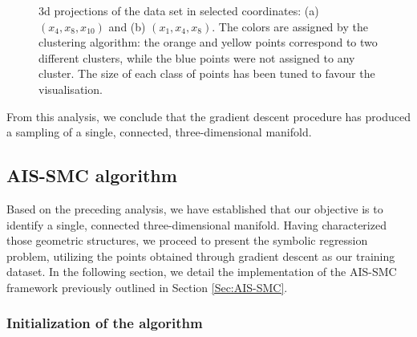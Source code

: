 \documentclass[11pt,a4paper]{article}
\begin{document}
\begin{figure}
{
		}
		\subfigure{\label{fig:3dx1x4x8}}
		\caption{3d projections of the data set in selected coordinates: (a) $(x_4, x_8, x_{10})$ and (b) $(x_1, x_4, x_8)$. The colors are assigned by the clustering algorithm: the orange and yellow points correspond to two different clusters, while the blue points were not assigned to any cluster. The size of each class of points has been tuned to favour the visualisation.}
		\label{fig:3dplots}
	\end{figure}
	
	From this analysis, we conclude that the gradient descent procedure has produced a sampling of a single, connected, three-dimensional manifold.




	\subsection{AIS-SMC algorithm}  \label{sec:AIS-SMC_application}
	Based on the preceding analysis, we have established that our objective is to identify a single, connected three-dimensional manifold. Having characterized those geometric structures, we proceed to present the symbolic regression problem, utilizing the points obtained through gradient descent as our training dataset. In the following section, we detail the implementation of the AIS-SMC framework previously outlined in Section \ref{Sec:AIS-SMC}.
	
	\subsubsection{Initialization of the algorithm}
	
\end{document}
